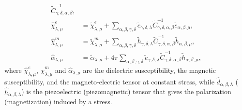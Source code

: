 \documentclass[12pt,a4paper]{article}
\begin{document}
{\begin{align}
\tilde C^{-1}_{\gamma,\delta,\alpha,\beta}, \\
\hat \chi^e_{\lambda,\mu}&= \tilde \chi^e_{\lambda,\mu}
+
\sum_{\alpha,\beta,\gamma,\delta}\tilde e_{\gamma,\delta,\lambda}
\tilde C^{-1}_{\gamma,\delta,\alpha,\beta} \tilde e_{\alpha,\beta,\mu}, \\
\hat \chi^m_{\lambda,\mu}&= \tilde \chi^m_{\lambda,\mu}
+\sum_{\alpha,\beta,\gamma,\delta}\tilde h_{\gamma,\delta,\lambda}
\tilde C^{-1}_{\gamma,\delta,\alpha,\beta} \tilde h_{\alpha,\beta,\mu}, \\
\hat \alpha_{\lambda,\mu}&= \tilde \alpha_{\lambda,\mu}
+4 \pi \sum_{\alpha,\beta,\gamma,\delta}\tilde e_{\gamma,\delta,\lambda}
\tilde C^{-1}_{\gamma,\delta,\alpha,\beta} \tilde h_{\alpha,\beta,\mu},
\end{align}
where $\hat \chi^e_{\lambda,\mu}$, $\hat \chi^m_{\lambda,\mu}$ and
$\hat \alpha_{\lambda,\mu}$ are the dielectric susceptibility, the magnetic
susceptibility, 
and the magneto-electric tensor at constant stress, while 
$\hat d_{\alpha,\beta,\lambda}$ ($\hat h_{\alpha,\beta,\lambda}$)
is the piezoelectric (piezomagnetic) tensor that
gives the polarization (magnetization) induced by a stress. 

}
\end{document}
